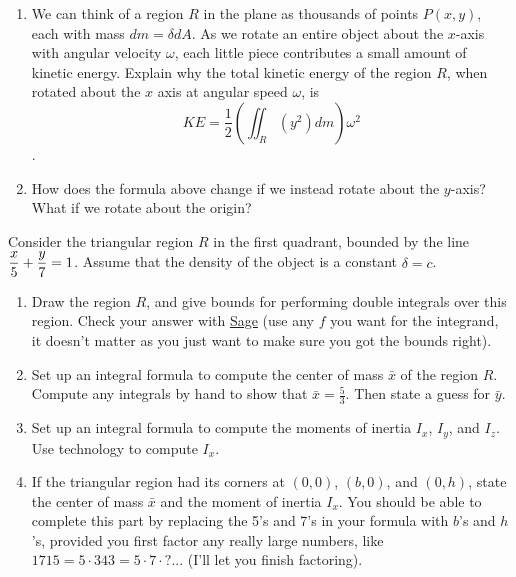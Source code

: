 {\begin{problem}
\begin{enumerate}
  \item We can think of a region $R$ in the plane as thousands of points $P(x,y)$, each with mass $dm=\delta dA$. As we rotate an entire object about the $x$-axis with angular velocity $\omega$, each little piece contributes a small amount of kinetic energy. Explain why the total kinetic energy of the region $R$, when rotated about the $x$ axis at angular speed $\omega$, is
$$KE= \frac{1}{2}\left(\iint_R (y^2)dm\right)\omega^2$$.  
  \item How does the formula above change if we instead rotate about the $y$-axis? What if we rotate about the origin?
 \end{enumerate}
\end{problem}



\begin{problem}
Consider the triangular region $R$ in the first quadrant, bounded by the line $\displaystyle \frac{x}{5}+\frac{y}{7}=1$.  Assume that the density of the object is a constant $\delta = c$.
 \begin{enumerate}
  \item Draw the region $R$, and give bounds for performing double integrals over this region. Check your answer with \href{\sageDoubleIntegralCheckerURL}{Sage} (use any $f$ you want for the integrand, it doesn't matter as you just want to make sure you got the bounds right).
  \item Set up an integral formula to compute the center of mass $\bar x$ of the region $R$.  Compute any integrals by hand to show that $\bar x = \frac{5}{3}$.  Then state a guess for $\bar y$. 
  \item Set up an integral formula to compute the moments of inertia $I_x$, $I_y$, and $I_z$.  Use technology to compute $I_x$.
  \item 
{}
If the triangular region had its corners at $(0,0)$, $(b,0)$, and $(0,h)$, state the center of mass $\bar x$ and the moment of inertia $I_x$. You should be able to complete this part by replacing the 5's and 7's in your formula with $b$'s and $h$'s, provided you first factor any really large numbers, like $1715 = 5\cdot 343=5\cdot 7\cdot ?...$ (I'll let you finish factoring). 
 \end{enumerate}


\end{problem}}
